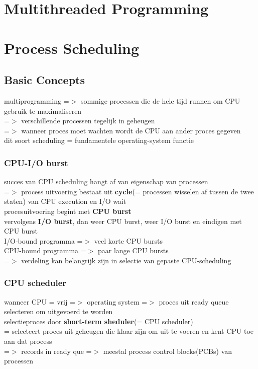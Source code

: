 \documentclass{report}
\begin{document}
\chapter{Multithreaded Programming}
\chapter{Process Scheduling}
\section{Basic Concepts}
multiprogramming =$>$ sommige processen die de hele tijd runnen om CPU gebruik te maximaliseren
\\=$>$ verschillende processen tegelijk in geheugen
\\=$>$ wanneer proces moet wachten wordt de CPU aan ander proces gegeven
\\dit soort scheduling = fundamentele operating-system functie
\subsection{CPU-I/O burst}
succes van CPU scheduling hangt af van eigenschap van processen
\\=$>$ process uitvoering bestaat uit \textbf{cycle}(= processen wisselen af tussen de twee staten) van CPU execution en I/O wait
\\procesuitvoering begint met \textbf{CPU burst}
\\vervolgens \textbf{I/O burst}, dan weer CPU burst, weer I/O burst en eindigen met CPU burst
\\I/O-bound programma =$>$ veel korte CPU bursts
\\CPU-bound programma =$>$ paar lange CPU bursts
\\=$>$ verdeling kan belangrijk zijn in selectie van gepaste CPU-scheduling

\subsection{CPU scheduler}
wanneer CPU = vrij =$>$ operating system =$>$ proces uit ready queue selecteren om uitgevoerd te worden
\\selectieproces door \textbf{short-term sheduler}(= CPU scheduler)
\\= selecteert proces uit geheugen die klaar zijn om uit te voeren en kent CPU toe aan dat process
\\=$>$ records in ready que =$>$ meestal process control blocks(PCBs) van processen
\end{document}
